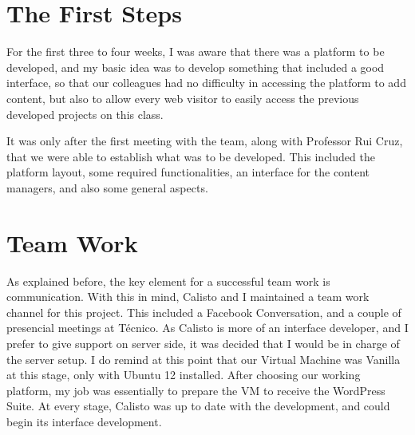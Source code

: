 \documentclass[a4paper,12pt,journal,twoside,compsoc]{PPIEEEtran}
\begin{document}
\section{The First Steps}
For the first three to four weeks, I was aware that there was a platform to be developed, and my basic idea was to develop something that included a good interface, so that our colleagues had no difficulty in accessing the platform to add content, but also to allow every web visitor to easily access the previous developed projects on this class.

It was only after the first meeting with the team, along with Professor Rui Cruz, that we were able to establish what was to be developed. This included the platform layout, some required functionalities, an interface for the content managers, and also some general aspects.


\section{Team Work}
As explained before, the key element for a successful team work is communication. With this in mind, Calisto and I maintained a team work channel for this project. This included a Facebook Conversation, and a couple of presencial meetings at Técnico. 
As Calisto is more of an interface developer, and I prefer to give support on server side, it was decided that I would be in charge of the server setup. I do remind at this point that our Virtual Machine was Vanilla at this stage, only with Ubuntu 12 installed.
After choosing our working platform, my job was essentially to prepare the VM to receive the WordPress Suite. At every stage, Calisto was up to date with the development, and could begin its interface development.
\end{document}
